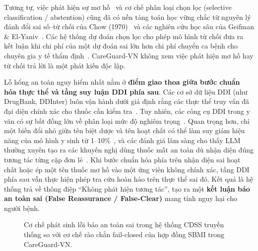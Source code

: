 \documentclass[11pt]{article}
\begin{document}
Tương tự, việc phát hiện sự mơ hồ~\cite{newmangriffis2021ambiguity} và cơ chế phân loại chọn lọc (selective classification / abstention) cũng đã có nền tảng toán học vững chắc từ nguyên lý đánh đổi sai số--từ chối của Chow (1970)~\cite{chow1970} và các nghiên cứu học sâu của Geifman \& El-Yaniv~\cite{geifman2017selective}. Các hệ thống dự đoán chọn lọc cho phép mô hình từ chối đưa ra kết luận khi chi phí của một dự đoán sai lớn hơn chi phí chuyển ca bệnh cho chuyên gia y tế thẩm định~\cite{swaminathan2024selective}. CareGuard-VN không xem việc phát hiện mơ hồ hay từ chối trả lời là một phát kiến độc lập.

Lỗ hổng an toàn nguy hiểm nhất nằm ở \textbf{điểm giao thoa giữa bước chuẩn hóa thực thể và tầng suy luận DDI phía sau}. Các cơ sở dữ liệu DDI (như DrugBank, DDInter) luôn vận hành dưới giả định rằng các thực thể truy vấn đã đại diện chính xác cho thuốc cần kiểm tra~\cite{wishart2018drugbank,tian2025ddinter}. Tuy nhiên, các công cụ DDI trong y văn có sự bất đồng lớn về phân loại mức độ nghiêm trọng~\cite{gibson2026ddireview}. Quan trọng hơn, chỉ một biến đổi nhỏ giữa tên biệt dược và tên hoạt chất có thể làm suy giảm hiệu năng của mô hình y sinh từ 1--10\%~\cite{gallifant2024rabbits}, và các đánh giá lâm sàng cho thấy LLM thường xuyên tạo ra các khuyến nghị dùng thuốc mất an toàn dù nhận diện đúng tương tác từng cặp đơn lẻ~\cite{chase2026ddi}. Khi bước chuẩn hóa phía trên nhận diện sai hoạt chất hoặc ép một tên thuốc mơ hồ vào một ứng viên không chính xác, tầng DDI phía sau vẫn thực hiện phép tra cứu hoàn hảo trên thực thể sai đó. Kết quả là hệ thống trả về thông điệp ``Không phát hiện tương tác'', tạo ra một \textbf{kết luận báo an toàn sai (False Reassurance / False-Clear)} mang tính nguy hại cho người bệnh.

\begin{figure}[t]
\centering
{}
\caption{Cơ chế phát sinh lỗi báo an toàn sai trong hệ thống CDSS truyền thống so với cơ chế rào chắn fail-closed của hợp đồng SBMI trong CareGuard-VN.}
\label{fig:motivating_example_vi}
\end{figure}
\end{document}
